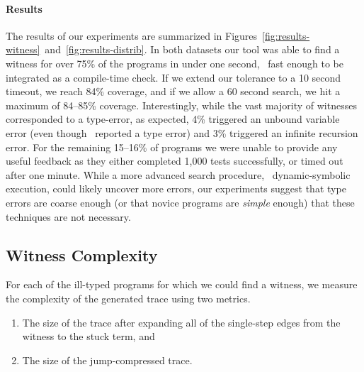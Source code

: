 \paragraph{Results}
\label{sec:nanomaly:results-witness}
The results of our experiments are summarized in
Figures~\ref{fig:results-witness}~and~\ref{fig:results-distrib}.
%
In both datasets our tool was able to find a witness for over 75\% of the
programs in under one second, \ie\ fast enough to be integrated as a
compile-time check. If we extend our tolerance to a 10 second timeout,
we reach 84\% coverage, and if we allow a 60 second search,
we hit a maximum of 84--85\% coverage.
%
Interestingly, while the vast majority of witnesses corresponded to a
type-error, as expected, 4\% triggered an unbound variable error (even
though \ocaml\ reported a type error) and 3\% triggered an infinite
recursion error.
%
For the remaining 15--16\% of programs we were unable to provide any useful
feedback as they either completed 1,000 tests successfully, or timed out
after one minute.
%
%
While a more advanced search procedure, \eg\ dynamic-symbolic execution,
could likely uncover more errors, our experiments suggest that
type errors are coarse enough (or that novice programs are \emph{simple}
enough) that these techniques are not necessary.




\subsection{Witness Complexity}
\label{sec:nanomaly:trace-complexity}

For each of the ill-typed programs for which we could
find a witness, we measure the complexity of the generated
trace using two metrics.

%
\begin{enumerate}
\item {} The size of the trace after expanding
  all of the single-step edges from the witness to the stuck term, and
\item {} The size of the jump-compressed trace.
\end{enumerate}


